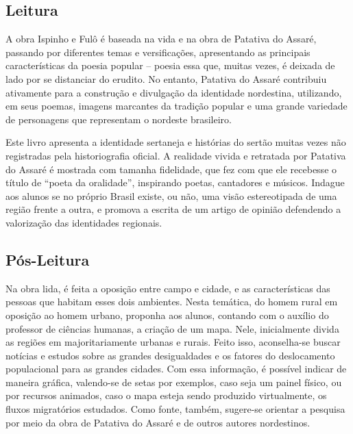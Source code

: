 \documentclass[12pt]{extarticle}
\begin{document}

\subsection{Leitura}

A obra Ispinho e Fulô é baseada na vida e na obra de
Patativa do Assaré, passando por diferentes temas e versificações,
apresentando as principais características da poesia popular -- poesia
essa que, muitas vezes, é deixada de lado por se distanciar do erudito.
No entanto, Patativa do Assaré contribuiu ativamente para a construção e
divulgação da identidade nordestina, utilizando, em seus poemas, imagens
marcantes da tradição popular e uma grande variedade de personagens que
representam o nordeste brasileiro.

Este livro apresenta a identidade sertaneja e histórias do sertão muitas
vezes não registradas pela historiografia oficial. A realidade vivida e
retratada por Patativa do Assaré é mostrada com tamanha fidelidade, que
fez com que ele recebesse o título de ``poeta da oralidade'', inspirando
poetas, cantadores e músicos. Indague aos alunos se no próprio Brasil
existe, ou não, uma visão estereotipada de uma região frente a outra, e
promova a escrita de um artigo de opinião defendendo a valorização das
identidades regionais.

\subsection{Pós-Leitura}

Na obra lida, é feita a oposição entre campo e cidade, e as
características das pessoas que habitam esses dois ambientes. Nesta
temática, do homem rural em oposição ao homem urbano, proponha aos
alunos, contando com o auxílio do professor de ciências humanas, a
criação de um mapa. Nele, inicialmente divida as regiões em
majoritariamente urbanas e rurais. Feito isso, aconselha-se buscar
notícias e estudos sobre as grandes desigualdades e os fatores do
deslocamento populacional para as grandes cidades. Com essa informação,
é possível indicar de maneira gráfica, valendo-se de setas por exemplos,
caso seja um painel físico, ou por recursos animados, caso o mapa esteja
sendo produzido virtualmente, os fluxos migratórios estudados. Como
fonte, também, sugere-se orientar a pesquisa por meio da obra de
Patativa do Assaré e de outros autores nordestinos.
\end{document}
